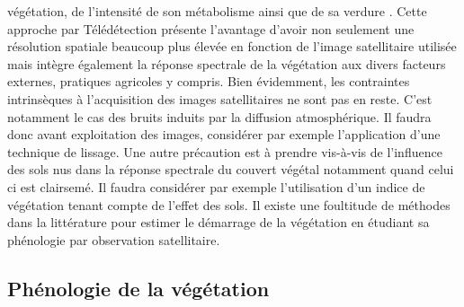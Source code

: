 végétation, de l’intensité de son métabolisme ainsi que de sa verdure \citep{Duarte2018}. Cette approche par Télédétection présente l'avantage d'avoir non seulement une résolution spatiale 
beaucoup plus élevée en fonction de l'image 
satellitaire utilisée mais intègre également la réponse spectrale de la végétation aux divers facteurs externes, pratiques agricoles y compris. Bien évidemment, les contraintes intrinsèques à 
l'acquisition des images satellitaires ne sont pas en reste. C'est notamment le cas des bruits induits par la diffusion atmosphérique. Il faudra donc avant exploitation des images, considérer 
par exemple l'application d'une technique de lissage. Une autre précaution est à prendre vis-à-vis de l'influence des sols nus dans la réponse spectrale du couvert végétal 
notamment quand celui ci est clairsemé. Il faudra considérer par exemple l'utilisation d'un indice de végétation tenant compte de l'effet des sols. 
Il existe une foultitude de méthodes dans la littérature pour estimer le démarrage de la végétation en étudiant sa phénologie par observation satellitaire. 
  
  \subsection{Phénologie de la végétation}
  
